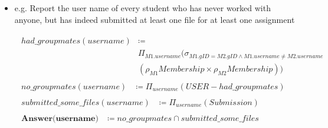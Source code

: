 \documentclass[12pt]{article}
\begin{document}
\begin{enumerate}[1.]
\begin{itemize}
        \item e.g. Report the user name of every student who has never worked with
        anyone, but has indeed submitted at least one file for at least one assignment

        \bigskip

        \begin{align*}
            \begin{split}
            had\_groupmates(username) &\coloneqq\\
            &\Pi_{M1.username}(\sigma_{M1.gID=M2.gID \land M1.username \neq M2.username}\\
            &(\rho_{M1}Membership \times \rho_{M2}Membership))
            \end{split}\\[1em]
            \begin{split}
            no\_groupmates(username) &\coloneqq \Pi_{username}(USER - had\_groupmates)
            \end{split}\\[1em]
            \begin{split}
            submitted\_some\_files(username) &\coloneqq \Pi_{username}(Submission)
            \end{split}\\[1em]
            \begin{split}
            \textbf{Answer(username)} &\coloneqq no\_groupmates \cap submitted\_some\_files
        \end{split}\\
        \end{align*}
    \end{itemize}

    \bigskip


\end{enumerate}
\end{document}
